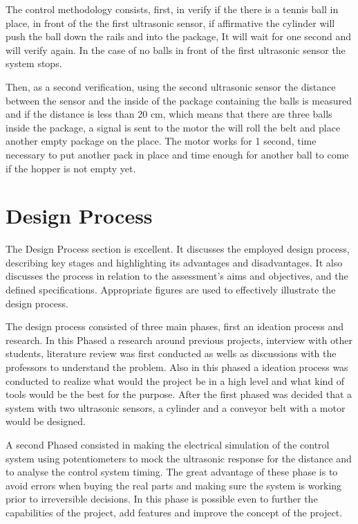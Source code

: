 \documentclass[transmag]{IEEEtran}
\begin{document}
The control methodology consists, first, in verify if the there is a tennis ball in place, in front of the the first ultrasonic sensor, if affirmative the cylinder will push the ball down the rails and into the package, It will wait for one second and will verify again. In the case of no balls in front of the first ultrasonic sensor the system stops.

Then, as a second verification, using the second ultrasonic sensor the distance between the sensor and the inside of the package containing the balls is measured and if the distance is less than 20 cm, which means that there are three balls inside the package, a signal is sent to the motor the will roll the belt and place another empty package on the place. The motor works for 1 second, time necessary to put another pack in place and time enough for another ball to come if the hopper is not empty yet.


 
\section{Design Process}

The Design Process section is excellent. It discusses the employed design process, describing key stages and highlighting its advantages and disadvantages. It also discusses the process in relation to the assessment’s aims and objectives, and the defined specifications. Appropriate figures are used to effectively illustrate the design process.

The design process consisted of three main phases, first an ideation process and research. In this Phased a research around previous projects, interview with other students, literature review was first conducted as wells as discussions with the professors to understand the problem. Also in this phased a ideation process was conducted to realize what would the project be in a high level and what kind of tools would be the best for the purpose.
After the first phased was decided that a system with two ultrasonic sensors, a cylinder and a conveyor belt with a motor would be designed.

A second Phased consisted in making the electrical simulation of the control system using potentiometers to mock the ultrasonic response for the distance and to analyse the control system timing. The great advantage of these phase is to avoid errors when buying the real parts and making sure the system is working prior to irreversible decisions. In this phase is possible even to further the capabilities of the project, add features and improve the concept of the project. 
\end{document}
